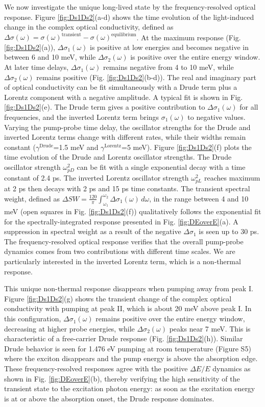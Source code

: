 \documentclass[
 reprint,
superscriptaddress,

 amsmath,amssymb,
 aps,

]{revtex4-2}
\begin{document}
We now investigate the unique long-lived state by the frequency-resolved optical response. Figure \ref{fig:Ds1Ds2}(a-d) shows the time evolution of the light-induced change in the complex optical conductivity, defined as $\Delta\sigma(\omega) = \sigma(\omega)^{\text{transient}} - \sigma(\omega)^{\text{equilibrium}}$. At the maximum response (Fig. \ref{fig:Ds1Ds2}(a)), $\Delta\sigma_1(\omega)$ is positive at low energies and becomes negative in between 6 and 10 meV, while $\Delta\sigma_2(\omega)$ is positive over the entire energy window. At later time delays, $\Delta\sigma_1(\omega)$ remains negative from 4 to 10 meV, while $\Delta\sigma_2(\omega)$ remains positive (Fig. \ref{fig:Ds1Ds2}(b-d)). The real and imaginary part of optical conductivity can be fit simultaneously with a Drude term plus a Lorentz component with a negative amplitude. A typical fit is shown in Fig. \ref{fig:Ds1Ds2}(e). The Drude term gives a positive contribution to $\Delta\sigma_1(\omega)$ for all frequencies, and the inverted Lorentz term brings $\sigma_1(\omega)$ to negative values. Varying the pump-probe time delay, the oscillator strengths for the Drude and inverted Lorentz terms change with different rates, while their widths remain constant ($\gamma^{\text{Drude}}$=1.5 meV and $\gamma^{\text{Lorentz}}$=5 meV). Figure \ref{fig:Ds1Ds2}(f) plots the time evolution of the Drude and Lorentz oscillator strengths. The Drude oscillator strength $\omega_{pD}^2$ can be fit with a single exponential decay with a time constant of 2.4 ps. The inverted Lorentz oscillator strength $\omega_{pL}^2$ reaches maximum at 2 ps then decays with 2 ps and 15 ps time constants. The transient spectral weight, defined as $\Delta SW=\frac{120}{\pi}\int_{\omega_1}^{\omega_2}\Delta\sigma_1(\omega) \,d\omega$, in the range between 4 and 10 meV (open squares in Fig. \ref{fig:Ds1Ds2}(f)) qualitatively follows the exponential fit for the spectrally-integrated response presented in Fig. \ref{fig:DEoverE}(a). A suppression in spectral weight as a result of the negative $\Delta\sigma_1$ is seen up to 30 ps. The frequency-resolved optical response verifies that the overall pump-probe dynamics comes from two contributions with different time scales. We are particularly interested in the inverted Lorentz term, which is a non-thermal response.

This unique non-thermal response disappears when pumping away from peak I. Figure \ref{fig:Ds1Ds2}(g) shows the transient change of the complex optical conductivity with pumping at peak II, which is about 20 meV above peak I. In this configuration, $\Delta\sigma_1(\omega)$ remains positive over the entire energy window, decreasing at higher probe energies, while $\Delta\sigma_2(\omega)$ peaks near 7 meV. This is characteristic of a free-carrier Drude response (Fig. \ref{fig:Ds1Ds2}(h))\cite{Dressel2002}. Similar Drude behavior is seen for 1.476 eV pumping at room temperature (Figure S5) where the exciton disappears and the pump energy is above the absorption edge. These frequency-resolved responses agree with the positive $\Delta E/E$ dynamics as shown in Fig. \ref{fig:DEoverE}(b), thereby verifying the high sensitivity of the transient state to the excitation photon energy: as soon as the excitation energy is at or above the absorption onset, the Drude response dominates.
\end{document}
